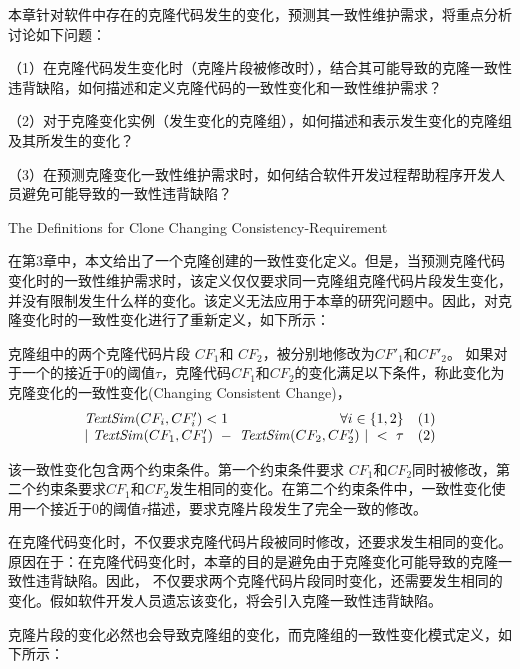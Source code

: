 本章针对软件中存在的克隆代码发生的变化，预测其一致性维护需求，将重点分析讨论如下问题：

（1）在克隆代码发生变化时（克隆片段被修改时），结合其可能导致的克隆一致性违背缺陷，如何描述和定义克隆代码的一致性变化和一致性维护需求？

（2）对于克隆变化实例（发生变化的克隆组），如何描述和表示发生变化的克隆组及其所发生的变化？

（3）在预测克隆变化一致性维护需求时，如何结合软件开发过程帮助程序开发人员避免可能导致的一致性违背缺陷？%


{The Definitions for Clone Changing Consistency-Requirement}

在第3章中，本文给出了一个克隆创建的一致性变化定义。但是，当预测克隆代码变化时的一致性维护需求时，该定义仅仅要求同一克隆组克隆代码片段发生变化，并没有限制发生什么样的变化。该定义无法应用于本章的研究问题中。因此，对克隆变化时的一致性变化进行了重新定义，如下所示：

\begin{definition}[克隆变化一致性变化]  
\label{def-changingchange}
克隆组中的两个克隆代码片段 $CF_1$和 $CF_2$，被分别地修改为$CF'_1$和$CF'_2$。  如果对于一个的接近于0的阈值$\tau$，克隆代码$CF_1$和$CF_2$的变化满足以下条件，称此变化为克隆变化的一致性变化(Changing Consistent Change)， 
  \[
  \begin{array}[t]{crl}
    \mathit{TextSim}(CF_i, CF'_i) < 1 & \forall i \in \{1,2\} &(1) \\
    \multicolumn{2}{c}{| ~\mathit{TextSim}(CF_1,CF'_1)  ~-~ \mathit{TextSim}(CF_2,CF'_2) ~| ~< ~ \tau}  & (2)
  \end{array}
  \]
\end{definition}

该一致性变化包含两个约束条件。第一个约束条件要求 $CF_1 $和$CF_2 $同时被修改，第二个约束条要求$CF_1 $和$CF_2$发生相同的变化。在第二个约束条件中，一致性变化使用一个接近于0的阈值$\tau$描述，要求克隆片段发生了完全一致的修改。%

在克隆代码变化时，不仅要求克隆代码片段被同时修改，还要求发生相同的变化。原因在于：在克隆代码变化时，本章的目的是避免由于克隆变化可能导致的克隆一致性违背缺陷。因此， 不仅要求两个克隆代码片段同时变化，还需要发生相同的变化。假如软件开发人员遗忘该变化，将会引入克隆一致性违背缺陷。

克隆片段的变化必然也会导致克隆组的变化，而克隆组的一致性变化模式定义，如下所示：

